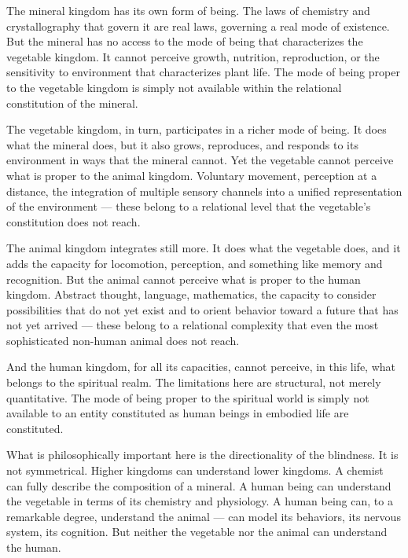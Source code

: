 The mineral kingdom has its own form of being.
The laws of chemistry and crystallography that govern it are real laws, governing a real mode of existence.
But the mineral has no access to the mode of being that characterizes the vegetable kingdom.
It cannot perceive growth, nutrition, reproduction, or the sensitivity to environment that characterizes plant life.
The mode of being proper to the vegetable kingdom is simply not available within the relational constitution of the mineral.

The vegetable kingdom, in turn, participates in a richer mode of being.
It does what the mineral does, but it also grows, reproduces, and responds to its environment in ways that the mineral cannot.
Yet the vegetable cannot perceive what is proper to the animal kingdom.
Voluntary movement, perception at a distance, the integration of multiple sensory channels into a unified representation of the environment --- these belong to a relational level that the vegetable's constitution does not reach.

The animal kingdom integrates still more.
It does what the vegetable does, and it adds the capacity for locomotion, perception, and something like memory and recognition.
But the animal cannot perceive what is proper to the human kingdom.
Abstract thought, language, mathematics, the capacity to consider possibilities that do not yet exist and to orient behavior toward a future that has not yet arrived --- these belong to a relational complexity that even the most sophisticated non-human animal does not reach.

And the human kingdom, for all its capacities, cannot perceive, in this life, what belongs to the spiritual realm.
The limitations here are structural, not merely quantitative.
The mode of being proper to the spiritual world is simply not available to an entity constituted as human beings in embodied life are constituted.

What is philosophically important here is the directionality of the blindness.
It is not symmetrical.
Higher kingdoms can understand lower kingdoms.
A chemist can fully describe the composition of a mineral.
A human being can understand the vegetable in terms of its chemistry and physiology.
A human being can, to a remarkable degree, understand the animal --- can model its behaviors, its nervous system, its cognition.
But neither the vegetable nor the animal can understand the human.

